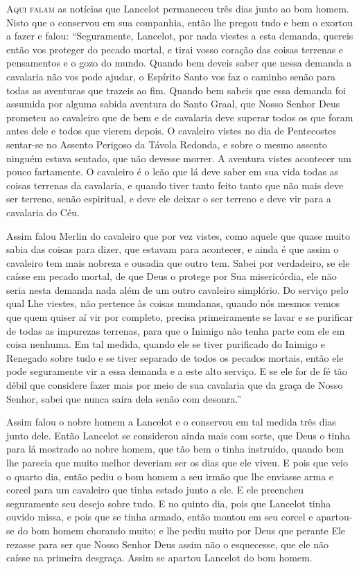 \textsc{Aqui falam} as notícias que Lancelot permaneceu três dias junto ao bom homem. 
Nisto que o conservou em sua companhia, então lhe pregou tudo e bem o
exortou a fazer e falou: “Seguramente, Lancelot, por nada viestes a esta
demanda, quereis então vos proteger do pecado mortal, e tirai vosso coração das
coisas terrenas e pensamentos e o gozo do mundo. Quando bem deveis
saber que nessa demanda a cavalaria não vos pode ajudar, o Espírito Santo vos
faz o caminho senão para todas as aventuras que trazeis ao fim. Quando bem
sabeis que essa demanda foi assumida por alguma sabida aventura do Santo Graal,
que Nosso Senhor Deus prometeu ao cavaleiro que de bem e de cavalaria deve
superar todos os que foram antes dele e todos que vierem depois. O cavaleiro
vistes no dia de Pentecostes sentar-se no Assento Perigoso da Távola Redonda, e
sobre o mesmo assento ninguém estava sentado, que não devesse morrer. A
aventura vistes acontecer um pouco fartamente. O cavaleiro é o leão que lá deve
saber em sua vida todas as coisas terrenas da cavalaria, e quando tiver tanto
feito tanto que não mais deve ser terreno, senão espiritual, e deve ele deixar
o ser terreno e deve vir para a cavalaria do Céu. 

Assim falou Merlin do cavaleiro que por vez vistes, como aquele que quase
muito sabia das coisas para dizer, que estavam para acontecer, e ainda é que
assim o cavaleiro tem mais nobreza e ousadia que outro tem. Sabei por
verdadeiro, se ele caísse em pecado mortal, de que Deus o protege por Sua
misericórdia, ele não seria nesta demanda nada além de um outro cavaleiro
simplório. Do serviço pelo qual Lhe viestes, não pertence às coisas mundanas,
quando nós mesmos vemos que quem quiser aí vir por completo, precisa
primeiramente se lavar e se purificar de todas as impurezas terrenas, para que
o Inimigo não tenha parte com ele em coisa nenhuma. Em tal medida, quando ele
se tiver purificado do Inimigo e Renegado sobre tudo e se tiver separado de
todos os pecados mortais, então ele pode seguramente vir a essa demanda e a
este alto serviço. E se ele for de fé tão débil que considere fazer mais por
meio de sua cavalaria que da graça de Nosso Senhor, sabei que nunca saíra dela
senão com desonra.” 

Assim falou o nobre homem a Lancelot e o conservou em tal medida três dias
junto dele. Então Lancelot se considerou ainda mais com sorte, que Deus o tinha
para lá mostrado ao nobre homem, que tão bem o tinha instruído, quando bem lhe
parecia que muito melhor deveriam ser os dias que ele viveu. E pois que veio o
quarto dia, então pediu o bom homem a seu irmão que lhe enviasse arma e corcel
para um cavaleiro que tinha estado junto a ele. E ele preencheu seguramente seu
desejo sobre tudo. E no quinto dia, pois que Lancelot tinha ouvido missa, e
pois que se tinha armado, então montou em seu corcel e apartou-se do bom homem
chorando muito; e lhe pediu muito por Deus que perante Ele rezasse para ser que
Nosso Senhor Deus assim não o esquecesse, que ele não caísse na primeira
desgraça. Assim se apartou Lancelot do bom homem. 

